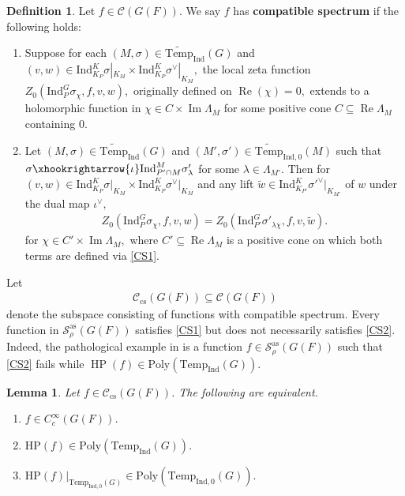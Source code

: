 \documentclass[10pt]{amsart}
\newtheorem{lemma}[theorem]{Lemma}
\theoremstyle{definition}
\newtheorem{definition}[theorem]{Definition}
\numberwithin{equation}{section}
\numberwithin{equation}{subsection}
\newcommand{\Ind}{\mathrm{Ind}}
\newcommand{\Temp}{\mathrm{Temp}}
\renewcommand{\Im}{\mathop{\mathrm{Im}}}
\renewcommand{\Re}{\mathop{\mathrm{Re}}}
\newcommand{\HP}{\mathop{\mathrm{HP}}\nolimits}
\begin{document}
\begin{definition}\label{def:cs}
    Let $f\in \mathcal{C}(G(F)).$ We say $f$ has \textbf{compatible spectrum} if the following holds:
    \begin{enumerate}[label=(CS\arabic*), ref=CS\arabic*]
    \item \label{CS1} Suppose for each $(M,\sigma)\in \widetilde{\mathrm{Temp}}_{\Ind}(G)$ and $(v,w)\in \mathrm{Ind}_{K_P}^K \sigma|_{K_M}\times \mathrm{Ind}_{K_P}^K \sigma^\lor|_{K_M},$  the local zeta function $Z_0(\mathrm{Ind}_P^G\sigma_\chi,f,v,w),$ originally defined on $\Re(\chi)=0,$ extends to a holomorphic function in $\chi\in C\times \Im\Lambda_M$ for some positive cone $C\subseteq \Re\Lambda_M$ containing $0$.
    \item \label{CS2} Let $(M,\sigma)\in\widetilde{\Temp}_\Ind(G)$ and $(M',\sigma')\in\widetilde{\Temp}_{\Ind,0}(M)$ such that $\sigma\xhookrightarrow{\iota} \mathrm{Ind}_{P'\cap M}^{M} \sigma'_{\lambda}$ for some $\lambda\in \Lambda_{M'}$. Then for $(v,w)\in \Ind_{K_P}^K\sigma\vert_{K_M}\times \Ind_{K_P}^K\sigma^\vee\vert_{K_M}$ and any lift $\tilde{w}\in \mathrm{Ind}_{K_{P'}}^{K}\sigma'^\lor|_{K_{M'}}$ of $w$ under the dual map $\iota^\lor,$
    \begin{align*}
            Z_0(\mathrm{Ind}_P^G \sigma_\chi, f,v,w)=Z_0(\mathrm{Ind}_{P'}^G \sigma'_{\lambda\chi}, f,v,\tilde{w}).
    \end{align*}
    for $\chi\in C'\times \Im\Lambda_{M},$ where $C'\subseteq \Re\Lambda_{M}$ is a positive cone on which both terms are defined via \eqref{CS1}.
    \end{enumerate}
\end{definition}
Let
\begin{align*}
    \mathcal{C}_{\mathrm{cs}}(G(F)) \subseteq\mathcal{C}(G(F))
\end{align*}
denote the subspace consisting of functions with compatible spectrum.  Every function in $\mathcal{S}_{\rho}^{\mathrm{as}}(G(F))$ satisfies \eqref{CS1} but does not necessarily satisfies \eqref{CS2}. Indeed, the pathological example in \cite[Example 6.2]{DRS} is a function $f\in \mathcal{S}_{\rho}^{\mathrm{as}}(G(F))$ such that \eqref{CS2} fails while $\HP(f)\in \mathrm{Poly}(\Temp_{\Ind}(G)).$




\begin{lemma}\label{lem:comp+poly} Let $f\in \mathcal{C}_{\mathrm{cs}}(G(F))$. The following are equivalent.
\begin{enumerate}
    \item $f\in C^\infty_c(G(F))$.
    \item $\mathrm{HP}(f)\in \mathrm{Poly}(\Temp_{\Ind}(G)).$
    \item $\mathrm{HP}(f)\vert_{\Temp_{\Ind,0}(G)}\in  \mathrm{Poly}(\Temp_{\Ind,0}(G)).$
\end{enumerate}
\end{lemma}
\end{document}
